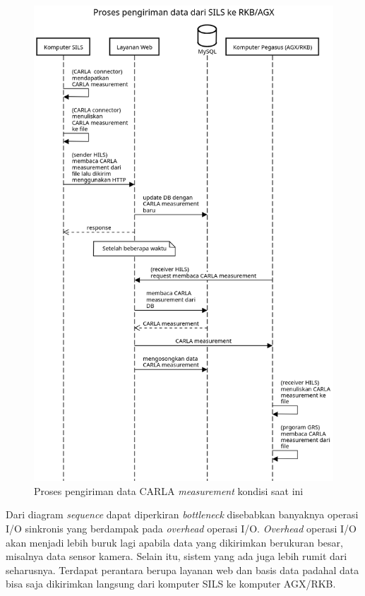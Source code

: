 \begin{figure}[h!]
	\centering
	\includegraphics[width=1.0\textwidth]{resources/chapter-3/sequence-diagram-old-hils-process.png}
	\caption{Proses pengiriman data CARLA \textit{measurement} kondisi saat ini}
	\label{chapter-3-sequence-diagram-old-hils}
\end{figure}

Dari diagram \textit{sequence} dapat diperkiran \textit{bottleneck} disebabkan
banyaknya operasi I/O sinkronis yang berdampak pada \textit{overhead} operasi
I/O. \textit{Overhead} operasi I/O a\-kan menjadi lebih buruk lagi apabila data
yang dikirimkan berukuran besar, misalnya data sensor kamera. Selain itu, sistem
yang ada juga lebih rumit dari seharusnya. Terdapat perantara berupa layanan web
dan basis data padahal data bisa saja dikirimkan langsung dari komputer SILS ke
komputer AGX/RKB.

